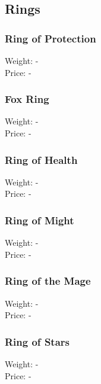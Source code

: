 \subsection{Rings}

\subsubsection{Ring of Protection}
Weight: -\\
Price: -\\

\subsubsection{Fox Ring}
Weight: -\\
Price: -\\

\subsubsection{Ring of Health}
Weight: -\\
Price: -\\

\subsubsection{Ring of Might}
Weight: -\\
Price: -\\

\subsubsection{Ring of the Mage}
Weight: -\\
Price: -\\

\subsubsection{Ring of Stars}
Weight: -\\
Price: -\\